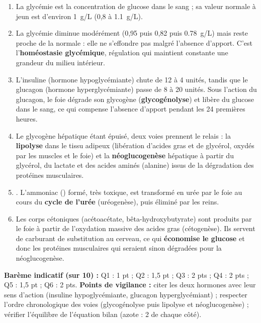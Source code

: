 \documentclass[11pt]{article}
\begin{document}
\begin{corrige}
\begin{enumerate}
\item La glycémie est la concentration de glucose dans le sang ; sa valeur normale à jeun est d'environ \SI{1}{g/L} (0,8 à \SI{1,1}{g/L}).
\item La glycémie diminue modérément (0,95 puis 0,82 puis \SI{0,78}{g/L}) mais reste proche de la normale : elle ne s'effondre pas malgré l'absence d'apport. C'est l'\textbf{homéostasie glycémique}, régulation qui maintient constante une grandeur du milieu intérieur.
\item L'insuline (hormone hypoglycémiante) chute de 12 à 4 unités, tandis que le glucagon (hormone hyperglycémiante) passe de 8 à 20 unités. Sous l'action du glucagon, le foie dégrade son glycogène (\textbf{glycogénolyse}) et libère du glucose dans le sang, ce qui compense l'absence d'apport pendant les 24 premières heures.
\item Le glycogène hépatique étant épuisé, deux voies prennent le relais : la \textbf{lipolyse} dans le tissu adipeux (libération d'acides gras et de glycérol, oxydés par les muscles et le foie) et la \textbf{néoglucogenèse} hépatique à partir du glycérol, du lactate et des acides aminés (alanine) issus de la dégradation des protéines musculaires.
\item {}. L'ammoniac () formé, très toxique, est transformé en urée par le foie au cours du \textbf{cycle de l'urée} (uréogenèse), puis éliminé par les reins.
\item Les corps cétoniques (acétoacétate, bêta-hydroxybutyrate) sont produits par le foie à partir de l'oxydation massive des acides gras (cétogenèse). Ils servent de carburant de substitution au cerveau, ce qui \textbf{économise le glucose} et donc les protéines musculaires qui seraient sinon dégradées pour la néoglucogenèse.
\end{enumerate}
\textbf{Barème indicatif (sur 10) :} Q1 : 1 pt ; Q2 : 1,5 pt ; Q3 : 2 pts ; Q4 : 2 pts ; Q5 : 1,5 pt ; Q6 : 2 pts.
\textbf{Points de vigilance :} citer les deux hormones avec leur sens d'action (insuline hypoglycémiante, glucagon hyperglycémiant) ; respecter l'ordre chronologique des voies (glycogénolyse puis lipolyse et néoglucogenèse) ; vérifier l'équilibre de l'équation bilan (azote : 2 de chaque côté).
\end{corrige}
\end{document}
